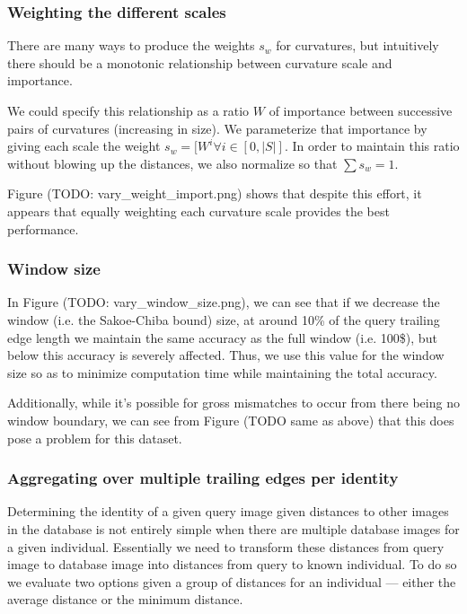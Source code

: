\subsubsection{Weighting the different scales}

There are many ways to produce the weights $s_w$ for curvatures, but intuitively there should be a monotonic relationship between curvature scale and importance.

We could specify this relationship as a ratio $W$ of importance between successive pairs of curvatures (increasing in size).
We parameterize that importance by giving each scale the weight $s_w = [W^i \forall i \in [0,|S|]$.
In order to maintain this ratio without blowing up the distances, we also normalize so that $\sum s_w = 1$.

Figure (TODO: vary\_weight\_import.png) shows that despite this effort, it appears that equally weighting each curvature scale provides the best performance.

\subsubsection{Window size}

In Figure (TODO: vary\_window\_size.png), we can see that if we decrease the window (i.e. the Sakoe-Chiba bound) size, at around 10\% of the query trailing edge length we maintain the same accuracy as the full window (i.e. 100\$), but below this accuracy is severely affected.
Thus, we use this value for the window size so as to minimize computation time while maintaining the total accuracy.

Additionally, while it's possible for gross mismatches to occur from there being no window boundary, we can see from Figure (TODO same as above) that this does pose a problem for this dataset.

\subsubsection{Aggregating over multiple trailing edges per identity}

Determining the identity of a given query image given distances to other images in the database is not entirely simple when there are multiple database images for a given individual.
Essentially we need to transform these distances from query image to database image into distances from query to known individual.
To do so we evaluate two options given a group of distances for an individual --- either the average distance or the minimum distance.

